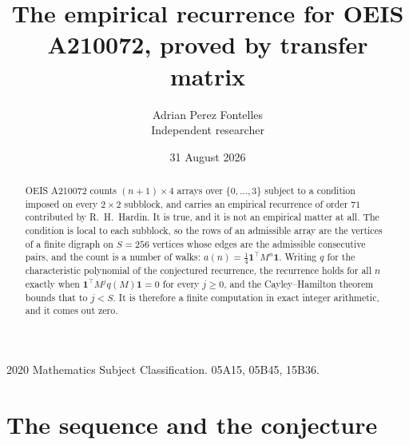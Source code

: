 \documentclass[11pt,a4paper]{article}
\title{The empirical recurrence for OEIS A210072, proved by transfer matrix}
\author{Adrian Perez Fontelles\\ \small Independent researcher}
\date{31 August 2026}
\theoremstyle{plain}
\theoremstyle{definition}
\begin{document}
\maketitle

\begin{abstract}
OEIS A210072 counts $(n+1)\times4$ arrays over $\{0,\dots,3\}$ subject to a condition imposed on
every $2\times2$ subblock, and carries an empirical recurrence of order $71$ contributed
by R.~H.~Hardin. It is true, and it is not an empirical matter at all. The condition is local
to each subblock, so the rows of an admissible array are the vertices of a finite digraph
on $S=256$ vertices whose edges are the admissible consecutive pairs, and the count is a
number of walks: $a(n)=\tfrac1{4}\mathbf{1}^{\!\top}M^{n}\mathbf{1}$. Writing $q$
for the characteristic polynomial of the conjectured recurrence, the recurrence holds for all
$n$ exactly when $\mathbf{1}^{\!\top}M^{j}q(M)\mathbf{1}=0$ for every $j\ge0$, and the
Cayley--Hamilton theorem bounds that to $j<S$. It is therefore a finite computation in exact
integer arithmetic, and it comes out zero.
\end{abstract}

\noindent\small 2020 Mathematics Subject Classification. 05A15, 05B45, 15B36.\normalsize

\section{The sequence and the conjecture}
\end{document}

